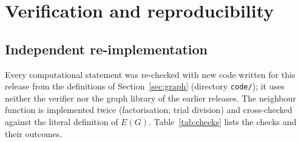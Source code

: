 \section{Verification and reproducibility}\label{sec:verification}
\subsection{Independent re-implementation}
Every computational statement was re-checked with new code written for this release from the definitions of Section~\ref{sec:graph} (directory \texttt{code/}); it uses neither the verifier nor the graph library of the earlier releases. The neighbour function is implemented twice (factorisation; trial division) and cross-checked against the literal definition of $E(G)$. Table~\ref{tab:checks} lists the checks and their outcomes.

